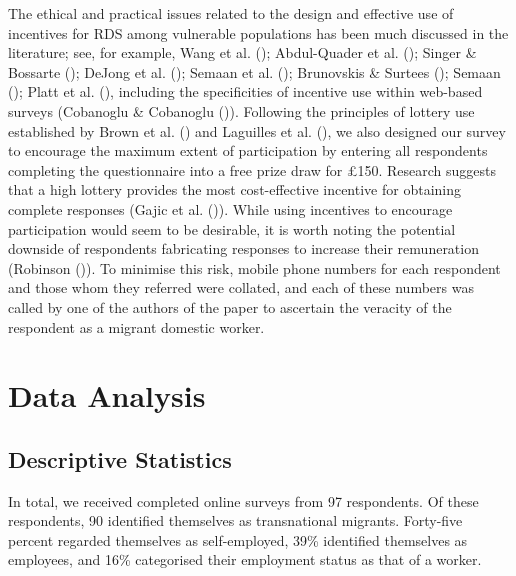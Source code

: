 \documentclass[
  12pt,
]{article}
\theoremstyle{plain}
\theoremstyle{definition}
\begin{document}
The ethical and practical issues related to the design and effective use
of incentives for RDS among vulnerable populations has been much
discussed in the literature; see, for example, Wang et al.
(); Abdul-Quader et al.
(); Singer \&
Bossarte (); DeJong et al.
(); Semaan et al.
(); Brunovskis \& Surtees
(); Semaan
(); Platt et al.
(), including the specificities
of incentive use within web-based surveys (Cobanoglu \& Cobanoglu
()). Following the principles
of lottery use established by Brown et al.
() and Laguilles et al.
(), we also designed our survey
to encourage the maximum extent of participation by entering all
respondents completing the questionnaire into a free prize draw for
£150. Research suggests that a high lottery provides the most
cost-effective incentive for obtaining complete responses (Gajic et al.
()). While using
incentives to encourage participation would seem to be desirable, it is
worth noting the potential downside of respondents fabricating responses
to increase their remuneration (Robinson
()). To minimise this risk,
mobile phone numbers for each respondent and those whom they referred
were collated, and each of these numbers was called by one of the
authors of the paper to ascertain the veracity of the respondent as a
migrant domestic worker.

\section{Data Analysis}\label{data-analysis}

\subsection{Descriptive Statistics}\label{descriptive-statistics}

In total, we received completed online surveys from 97 respondents. Of
these respondents, 90 identified themselves as transnational migrants.
Forty-five percent regarded themselves as self-employed, 39\% identified
themselves as employees, and 16\% categorised their employment status as
that of a worker.
\end{document}
